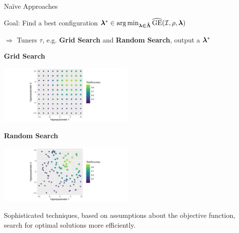 \documentclass[11pt,compress,t,notes=noshow, xcolor=table]{beamer}
\begin{document}
\begin{vbframe}{Naïve Approaches}

Goal: Find a best configuration $\bm{\lambda}^{*} \in \operatorname{arg\,min} \limits_{\boldsymbol{\lambda \in \tilde{\bm{\Lambda}}}} \widehat{\mathrm{GE}}(\mathcal{I}, \rho, \bm{\lambda}) $

$\Rightarrow$ Tuners $\tau$, e.g. \textbf{Grid Search} and \textbf{Random Search}, output a $\bm{\lambda}^{*}$

\vspace{2em}

\begin{minipage}{0.51\textwidth}
\begin{center}
\textbf{Grid Search}
\end{center}

\includegraphics[width=190pt]{figure/cart_tuning_balgos_1.pdf}
\end{minipage}
\begin{minipage}{0.48\textwidth}
\begin{center}
\textbf{Random Search}
\end{center}

\includegraphics[width=190pt]{figure/cart_tuning_balgos_2.pdf}
\end{minipage}

\vspace{4em}
\small Sophisticated techniques, based on assumptions about the objective function, search for optimal solutions more efficiently.
\end{vbframe}
\end{document}
